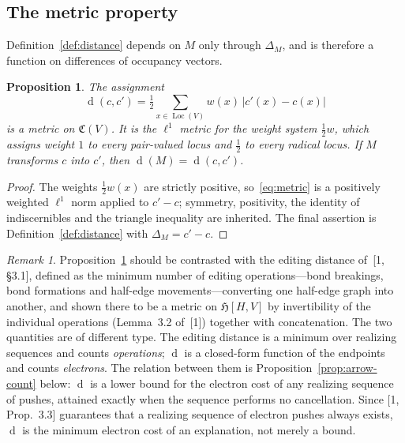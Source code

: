 \documentclass[11pt]{article}
\numberwithin{equation}{section}
\newcommand{\Loc}{\operatorname{Loc}}
\newcommand{\del}{\operatorname{d}}
\newcommand{\Occ}{\mathfrak{C}}
\theoremstyle{plain}
\newtheorem{proposition}[theorem]{Proposition}
\theoremstyle{definition}
\theoremstyle{remark}
\newtheorem{remark}[theorem]{Remark}
\begin{document}
\subsection{The metric property}

Definition~\ref{def:distance} depends on $M$ only through $\Delta_M$, and is
therefore a function on differences of occupancy vectors.

\begin{proposition}
\label{prop:metric}
The assignment
\begin{equation}
  \del(c,c')=\tfrac12\sum_{x\in\Loc(V)}w(x)\,\bigl|c'(x)-c(x)\bigr|
  \label{eq:metric}
\end{equation}
is a metric on $\Occ(V)$.  It is the $\ell^1$ metric for the weight system
$\tfrac12 w$, which assigns weight $1$ to every pair-valued locus and
$\tfrac12$ to every radical locus.  If $M$ transforms $c$ into $c'$, then
$\del(M)=\del(c,c')$.
\end{proposition}

\begin{proof}
The weights $\tfrac12 w(x)$ are strictly positive, so~\eqref{eq:metric} is a
positively weighted $\ell^1$ norm applied to $c'-c$; symmetry, positivity, the
identity of indiscernibles and the triangle inequality are inherited.  The
final assertion is Definition~\ref{def:distance} with $\Delta_M=c'-c$.
\end{proof}

\begin{remark}
\label{rem:vs-editing-distance}
Proposition~\ref{prop:metric} should be contrasted with the editing distance
of~[1, \S3.1], defined as the minimum number of editing operations---bond
breakings, bond formations and half-edge movements---converting one half-edge
graph into another, and shown there to be a metric on $\mathfrak H[H,V]$ by
invertibility of the individual operations (Lemma~3.2 of~[1]) together with
concatenation.  The two quantities are of different type.  The editing
distance is a minimum over realizing sequences and counts \emph{operations};
$\del$ is a closed-form function of the endpoints and counts \emph{electrons}.
The relation between them is Proposition~\ref{prop:arrow-count} below: $\del$
is a lower bound for the electron cost of any realizing sequence of pushes,
attained exactly when the sequence performs no cancellation.  Since [1,
Prop.~3.3] guarantees that a realizing sequence of electron pushes always
exists, $\del$ is the minimum electron cost of an explanation, not merely a
bound.
\end{remark}
\end{document}
